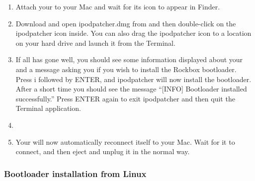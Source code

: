 \begin{enumerate}

\item Attach your \dap{} to your Mac and wait for its icon to appear in
Finder.

\item Download and open ipodpatcher.dmg from
and then double-click on the ipodpatcher icon inside. You can also
drag the ipodpatcher icon to a location on your hard drive and launch
it from the Terminal.

\item If all has gone well, you should see some
information displayed about your \dap{} and a message asking you if you
wish to install the Rockbox bootloader. Press i followed by ENTER, and
ipodpatcher will now install the bootloader. After a short time you
should see the message ``[INFO] Bootloader installed successfully.'' Press
ENTER again to exit ipodpatcher and then quit the Terminal application.

\item {}

\item Your \dap{} will now automatically reconnect itself to your Mac.
Wait for it to connect, and then eject and unplug it in the normal way.

\end{enumerate}

\subsubsection{Bootloader installation from Linux}

